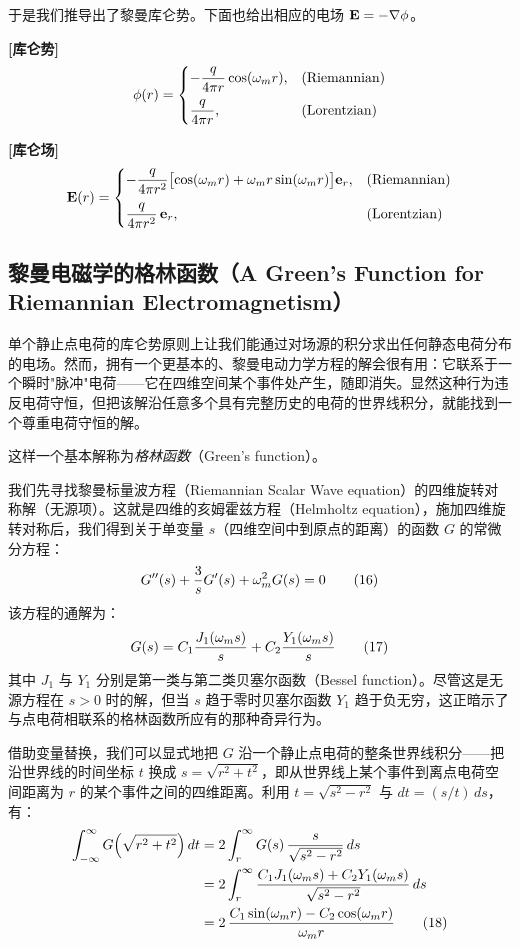 于是我们推导出了黎曼库仑势。下面也给出相应的电场 $\mathbf{E} = -\nabla\phi$。

\begin{keybox}[库仑势与库仑场]
\textbf{[库仑势]}
\[
\phi(r) = \begin{cases}
-\dfrac{q}{4\pi r}\cos(\omega_m r), & \text{(Riemannian)}\\[8pt]
\dfrac{q}{4\pi r}, & \text{(Lorentzian)}
\end{cases}
\]

\textbf{[库仑场]}
\[
\mathbf{E}(r) = \begin{cases}
-\dfrac{q}{4\pi r^{2}}
\bigl[\cos(\omega_m r) + \omega_m r\sin(\omega_m r)\bigr]\mathbf{e}_{r}, & \text{(Riemannian)}\\[9pt]
\dfrac{q}{4\pi r^{2}}\,\mathbf{e}_{r}, & \text{(Lorentzian)}
\end{cases}
\]
\end{keybox}

\subsection{黎曼电磁学的格林函数（A Green's Function for Riemannian Electromagnetism）}

单个静止点电荷的库仑势原则上让我们能通过对场源的积分求出任何静态电荷分布的电场。然而，拥有一个更基本的、黎曼电动力学方程的解会很有用：它联系于一个瞬时"脉冲"电荷——它在四维空间某个事件处产生，随即消失。显然这种行为违反电荷守恒，但把该解沿任意多个具有完整历史的电荷的世界线积分，就能找到一个尊重电荷守恒的解。

这样一个基本解称为\emph{格林函数}（Green's function）。

我们先寻找黎曼标量波方程（Riemannian Scalar Wave equation）的四维旋转对称解（无源项）。这就是四维的亥姆霍兹方程（Helmholtz equation），施加四维旋转对称后，我们得到关于单变量 $s$（四维空间中到原点的距离）的函数 $G$ 的常微分方程：
\begin{equation}
G''(s) + \frac{3}{s}G'(s) + \omega_m^{2}G(s) = 0 \tag{16}
\end{equation}
该方程的通解为：
\begin{equation}
G(s) = C_{1}\frac{J_{1}(\omega_m s)}{s} + C_{2}\frac{Y_{1}(\omega_m s)}{s} \tag{17}
\end{equation}
其中 $J_{1}$ 与 $Y_{1}$ 分别是第一类与第二类贝塞尔函数（Bessel function）。尽管这是无源方程在 $s>0$ 时的解，但当 $s$ 趋于零时贝塞尔函数 $Y_{1}$ 趋于负无穷，这正暗示了与点电荷相联系的格林函数所应有的那种奇异行为。

借助变量替换，我们可以显式地把 $G$ 沿一个静止点电荷的整条世界线积分——把沿世界线的时间坐标 $t$ 换成 $s = \sqrt{r^{2}+t^{2}}$，即从世界线上某个事件到离点电荷空间距离为 $r$ 的某个事件之间的四维距离。利用 $t = \sqrt{s^{2}-r^{2}}$ 与 $dt = (s/t)\,ds$，有：
\begin{align}
\int_{-\infty}^{\infty}G\!\left(\sqrt{r^{2}+t^{2}}\right)dt
&= 2\int_{r}^{\infty}G(s)\,\frac{s}{\sqrt{s^{2}-r^{2}}}\,ds \nonumber\\
&= 2\int_{r}^{\infty}\frac{C_{1}J_{1}(\omega_m s) + C_{2}Y_{1}(\omega_m s)}{\sqrt{s^{2}-r^{2}}}\,ds \nonumber\\
&= 2\,\frac{C_{1}\sin(\omega_m r) - C_{2}\cos(\omega_m r)}{\omega_m r} \tag{18}
\end{align}

